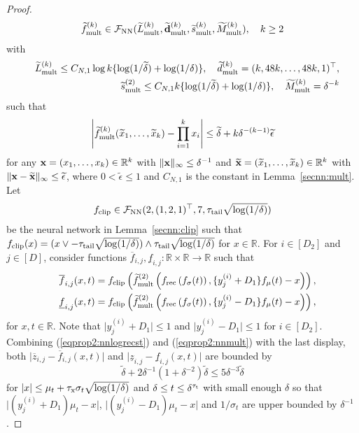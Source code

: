 \documentclass[twoside,11pt]{article}
\def\cF{\mathcal F}
\newcommand{\bd}{{\bf d}}
\newcommand{\bx}{{\bf x}}
\newcommand{\bbR}{{\mathbb R}}
\newcommand{\be}{\begin{equation}}
\newcommand{\ee}{\end{equation}}
\newcommand{\bean}{\setlength\arraycolsep{1pt}\begin{eqnarray*}}
\newcommand{\eean}{\end{eqnarray*}}
\begin{document}
\begin{proof}
\bean
\widetilde f_{\rm mult}^{(k)} \in \cF_{\rm NN} ( \widetilde L_{\rm mult}^{(k)}, \widetilde \bd_{\rm mult}^{(k)}, \widetilde s_{\rm mult}^{(k)}, \widetilde M_{\rm mult}^{(k)} ), \quad k \geq 2
\eean
with 
\bean
&& \widetilde L_{\rm mult}^{(k)} \leq C_{N,1} \log k  \{\log(1/ \widetilde \delta) + \log(1/\delta) \}, \quad \widetilde d_{\rm mult}^{(k)} = (k,48k,\ldots,48k,1)^{\top},
\\
&& \widetilde s_{\rm mult}^{(2)} \leq  C_{N,1} k \{\log(1/ \widetilde \delta) 
+  \log(1/ \delta) \}, \quad  \widetilde M_{\rm mult}^{(k)} = \delta^{-k}
\eean
such that 
\be
\left\vert \widetilde f_{\rm mult}^{(k)}(\widetilde x_1,\ldots, \widetilde x_k) - \prod_{i=1}^{k} x_i \right\vert \leq \widetilde \delta + k \delta^{-(k-1)} \widetilde \epsilon \label{eqprop2:nnmult}
\ee
for any $\bx = (x_1,\ldots,x_k) \in \bbR^{k}$ with $ \|\bx\|_{\infty} \leq \delta^{-1}$ and $\widetilde \bx = (\widetilde x_1,\ldots,\widetilde x_{k}) \in \bbR^{k}$ with $\| \bx - \widetilde \bx\|_{\infty} \leq \widetilde \epsilon$,
where $0 < \widetilde \epsilon \leq 1 $ and $C_{N,1}$ is the constant in Lemma~\ref{secnn:mult}.
Let 
\bean
f_{\rm clip} \in \cF_{\rm NN}(2,(1,2,1)^{\top}, 7, \tau_{\rm tail} \sqrt{\log(1/\delta)} )
\eean
be the neural network in Lemma~\ref{secnn:clip} such that
$f_{\rm clip}(x) = (x \vee -\tau_{\rm tail}\sqrt{\log(1/\delta)}  ) \wedge \tau_{\rm tail} \sqrt{\log(1/\delta)}$ for $x \in \bbR$.
For $i \in [D_{2}]$ and $ j \in [D]$, consider functions $\overline{f}_{i,j}, \underline{f}_{i,j} : \bbR \times \bbR \to \bbR$ such that
\bean
&& \overline{f}_{i,j} (x,t) = f_{\rm clip}\left( \widetilde f_{\rm mult}^{(2)}\left( f_{\rm rec}\left(f_{\sigma}(t) \right), \{ y_j^{(i)} +  D_{1} \} f_{\mu}(t) - x \right)  \right),
 \\
 && \underline{f}_{i,j} (x,t) = f_{\rm clip}\left( \widetilde f_{\rm mult}^{(2)}\left( f_{\rm rec}\left(f_{\sigma}(t) \right), \{ y_j^{(i)} -  D_{1} \} f_{\mu}(t) - x \right) \right),
\eean
for $x,t \in \bbR$.
Note that $\vert y_j^{(i)}+ D_{1} \vert \leq 1 $ and $\vert y_j^{(i)} - D_{1} \vert \leq 1 $ for $i \in [D_2]$.
Combining (\ref{eqprop2:nnlogrecst}) and (\ref{eqprop2:nnmult}) with the last display, both $\vert \overline{z}_{i,j} - \overline{f}_{i,j} (x,t) \vert$ and $\vert \underline{z}_{i,j} - \underline{f}_{i,j} (x,t) \vert$ are bounded by
\be
\widetilde \delta + 2 \delta^{-1} ( 1 + \delta^{-2} ) \widetilde \delta
\leq 5 \delta^{-3} \widetilde \delta \label{eqprop2:nnzij}
\ee
for $ \vert x \vert \leq  \mu_{t} + \tau_{\rm x} \sigma_{t} \sqrt{\log (1/\delta)}$ and $\delta \leq t \leq \delta^{\tau_{\rm t}}$ with small enough $\delta$ so that $\vert (y_j^{(i)} + D_{1} ) \mu_t - x \vert $, $\vert (y_j^{(i)} - D_{1} ) \mu_t - x \vert $ and $ 1/\sigma_t$ are upper bounded by $\delta^{-1}$.

\end{proof}
\end{document}
